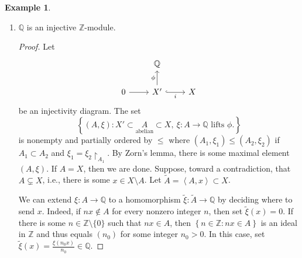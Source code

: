 \documentclass[10pt,letterpaper,cm]{nupset}
\theoremstyle{definition}
\newtheorem{exmp}[definition]{Example}
\theoremstyle{theorem}
\theoremstyle{remark}
\newcommand{\Q}{\mathbb Q}
\newcommand{\Z}{\mathbb Z}
\newcommand{\1}{\mathbf{1}}
\newcommand{\0}{\vec 0}
\begin{document}
\begin{exmp} $ $
\begin{enumerate}
\item $\Q$ is an injective $\Z$-module.
\begin{proof}
Let \[
\begin{tikzcd}
 & \Q &  \\
0 \arrow[r] & X' \arrow[r, "i"', hook] \arrow[u, "\phi"] & X
\end{tikzcd}
\] be an injectivity diagram. The set $$\left\{ (A, \xi) : X' \subset \underset{\text{abelian}}{A} \subset X, \ \xi : A \to \Q \text{ lifts } \phi.  \right\}$$ is nonempty and partially ordered  by $\leq$ where $\left(A_1, \xi_1\right) \leq \left(A_2, \xi_2\right)$ if $A_1 \subset A_2$ and $\xi_1 = \xi_2\restriction_{A_1}$. By Zorn's lemma, there is some maximal element $\left(A, \xi\right)$. If $A = X$, then we are done. Suppose, toward a contradiction, that $A \subsetneq X$, i.e., there is some $x\in X \setminus A$. Let $\tilde{A} = \left\langle A, x\right\rangle \subset X$. 

We can extend $\xi : A \to \Q$ to a homomorphism $\tilde{\xi} : \tilde{A} \to \Q$ by deciding where to send $x$. Indeed, if $nx \notin A$ for every nonzero integer $n$, then set $\tilde{\xi}(x) = 0$. If there is some $n\in \Z \setminus \{0\}$ such that $nx \in A$, then $\left\{n \in \Z : nx \in A\right\}$ is an ideal in $\Z$ and thus equals $\left(n_0\right)$ for some integer $n_0 >0$. In this case, set $\tilde{\xi}(x) = \frac{\xi(n_0x)}{n_0} \in \Q$. 


\end{proof}
\end{enumerate}
\end{exmp}
\end{document}
